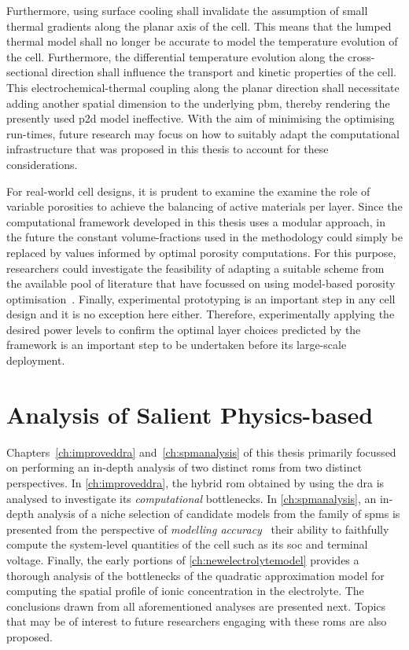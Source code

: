 Furthermore,  using surface  cooling shall  invalidate the  assumption of  small
thermal gradients along the planar axis of  the cell. This means that the lumped
thermal model  shall no longer  be accurate  to model the  temperature evolution
of  the cell.  Furthermore,  the differential  temperature  evolution along  the
cross-sectional direction  shall influence the transport  and kinetic properties
of the  cell. This electrochemical-thermal  coupling along the  planar direction
shall necessitate adding another spatial  dimension to the underlying \gls{pbm},
thereby rendering the  presently used \gls{p2d} model ineffective.  With the aim
of minimising  the optimising  run-times, future  research may  focus on  how to
suitably adapt the computational infrastructure that was proposed in this thesis
to account for these considerations.

For  real-world cell  designs, it  is prudent  to examine  the examine  the role
of  variable  porosities  to  achieve  the balancing  of  active  materials  per
layer.  Since  the computational  framework  developed  in  this thesis  uses  a
modular  approach, in  the  future  the constant  volume-fractions  used in  the
methodology  could simply  be replaced  by values  informed by  optimal porosity
computations. For this purpose, researchers could investigate the feasibility of
adapting  a suitable  scheme from  the available  pool of  literature that  have
focussed  on  using  model-based  porosity  optimisation~\cite{Xue2013,Xue2014a,
Christensen2006}. Finally, experimental prototyping is  an important step in any
cell  design and  it  is  no exception  here  either. Therefore,  experimentally
applying the desired power levels to confirm the optimal layer choices predicted
by the  framework is an important  step to be undertaken  before its large-scale
deployment.


\section{Analysis of Salient Physics-based }

Chapters~\ref{ch:improveddra} and~\ref{ch:spmanalysis} of  this thesis primarily
focussed on performing an in-depth analysis of two distinct \glspl{rom} from two
distinct perspectives.  In \cref{ch:improveddra}, the hybrid  \gls{rom} obtained
by  using the  \gls{dra}  is analysed  to  investigate its  \emph{computational}
bottlenecks. In \cref{ch:spmanalysis}, an in-depth analysis of a niche selection
of  candidate models  from  the  family of  \glspl{spm}  is  presented from  the
perspective of \emph{modelling accuracy} \ie~their ability to faithfully compute
the  system-level quantities  of the  cell such  as its  \gls{soc} and  terminal
voltage. Finally, the early portions of \cref{ch:newelectrolytemodel} provides a
thorough analysis  of the bottlenecks  of the quadratic approximation  model for
computing the  spatial profile  of ionic concentration  in the  electrolyte. The
conclusions drawn  from all aforementioned  analyses are presented  next. Topics
that may  be of interest to  future researchers engaging with  these \glspl{rom}
are also proposed.

